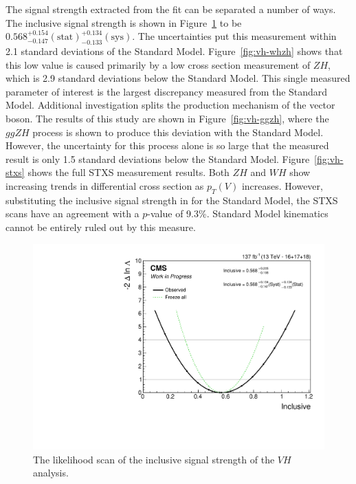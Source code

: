 The signal strength extracted from the fit can be separated a number of ways.
The inclusive signal strength is shown in Figure~\ref{fig:vh-inclusive} to be
$0.568^{+0.154}_{-0.147} \mathrm{(stat)}^{+0.134}_{-0.133} \mathrm{(sys)}$.
The uncertainties put this measurement within 2.1 standard deviations of the Standard Model.
Figure~\ref{fig:vh-whzh} shows that this low value is caused primarily by a low cross section measurement of $Z\!H$,
which is 2.9 standard deviations below the Standard Model.
This single measured parameter of interest is the largest discrepancy measured from the Standard Model.
Additional investigation splits the production mechanism of the vector boson.
The results of this study are shown in Figure~\ref{fig:vh-ggzh},
where the $ggZ\!H$ process is shown to produce this deviation with the Standard Model.
However, the uncertainty for this process alone is so large that the measured result is
only 1.5 standard deviations below the Standard Model.
Figure~\ref{fig:vh-stxs} shows the full STXS measurement results.
Both $Z\!H$ and $W\!H$ show increasing trends in differential cross section as $p_T(V)$ increases.
However, substituting the inclusive signal strength in for the Standard Model,
the STXS scans have an agreement with a $p$-value of 9.3\%.
Standard Model kinematics cannot be entirely ruled out by this measure.

\begin{figure}
  \centering
  \includegraphics[width=0.8\linewidth]{figures/210309_incl_unblinded_Xbb_8f854f5a_a866aef8/scan_nominal_r.pdf}
  \caption[Inclusive likelihood scan of $V\!H$]{
    The likelihood scan of the inclusive signal strength of the
    $V\!H$ analysis.
  }
  \label{fig:vh-inclusive}
\end{figure}

